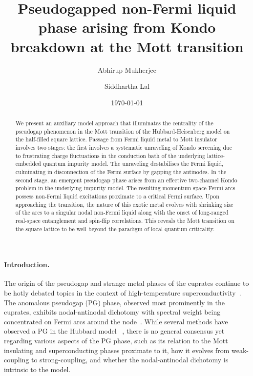 \documentclass[%
 reprint,
superscriptaddress,
groupedaddress,
 amsmath,amssymb,
 aps,
prl
]{revtex4-2}
\begin{document}
\title{Pseudogapped non-Fermi liquid phase arising from Kondo breakdown at the Mott transition}


\author{Abhirup Mukherjee}
\author{Siddhartha Lal}
%

\date{\today}
\begin{abstract}
We present an auxiliary model approach that illuminates the centrality of the pseudogap phenomenon in the Mott transition of the Hubbard-Heisenberg model on the half-filled square lattice. Passage from Fermi liquid metal to Mott insulator involves two stages: the first involves a systematic unraveling of Kondo screening due to frustrating charge fluctuations in the conduction bath of the underlying lattice-embedded quantum impurity model. The unraveling destabilises the Fermi liquid, culminating in disconnection of the Fermi surface by gapping the antinodes. In the second stage, an emergent pseudogap phase arises from an effective two-channel Kondo problem in the underlying impurity model. The resulting momentum space Fermi arcs possess non-Fermi liquid excitations proximate to a critical Fermi surface. Upon approaching the transition, the nature of this exotic metal evolves with shrinking size of the arcs to a singular nodal non-Fermi liquid along with the onset of long-ranged real-space entanglement and spin-flip correlations. This reveals the Mott transition on the square lattice to be well beyond the paradigm of local quantum criticality.
\end{abstract}

\maketitle

\paragraph*{Introduction.}
The origin of the pseudogap and strange metal phases of the cuprates continue to be hotly debated topics in the context of high-temperature superconductivity~\cite{keimer2015quantum,ProustTaillefer2019}. The anomalous pseudogap (PG) phase, observed most prominently in the cuprates, exhibits nodal-antinodal dichotomy with spectral weight being concentrated on Fermi arcs around the node~\cite{loeserKapitulnik1996,Norman1998,Hashimoto2014}. While several methods have observed a PG in the Hubbard model ~\cite{KyungKotliar2006,MacridinAzevedo2006,WuFerrero2018,anirbanmott2,HilleAndergassen2020}, there is no general consensus yet regarding various aspects of the PG phase, such as its relation to the Mott insulating and superconducting phases proximate to it, how it evolves from weak-coupling to strong-coupling, and whether the nodal-antinodal dichotomy is intrinsic to the model. 
\end{document}
